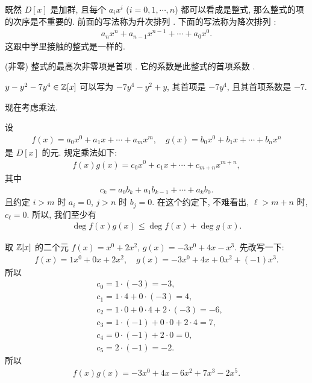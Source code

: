 \begin{remark}
    既然 $D[x]$ 是加群, 且每个 $a_i x^i$ ($i = 0,1,\cdots,n$) 都可以看成是整式, 那么整式的项的次序是不重要的. 前面的写法称为升次排列 . 下面的写法称为降次排列 :
    \begin{align*}
        a_n x^n + a_{n-1} x^{n-1} + \cdots + a_0 x^0.
    \end{align*}
    这跟中学里接触的整式是一样的.

    (非零) 整式的最高次非零项是首项 . 它的系数是此整式的首项系数 .
\end{remark}

\begin{example}
    $y - y^2 - 7y^4 \in \mathbb{Z}[x]$ 可以写为 $-7y^4 - y^2 + y$, 其首项是 $-7y^4$, 且其首项系数是 $-7$.
\end{example}

现在考虑乘法.

\begin{definition}
    设
    \begin{align*}
        f(x) = a_0 x^0 + a_1 x + \cdots + a_m x^m, \quad g(x) = b_0 x^0 + b_1 x + \cdots + b_n x^n
    \end{align*}
    是 $D[x]$ 的元. 规定乘法如下:
    \begin{align*}
        f(x) g(x) = c_0 x^0 + c_1 x + \cdots + c_{m+n} x^{m+n},
    \end{align*}
    其中
    \begin{align*}
        c_k = a_0 b_k + a_1 b_{k-1} + \cdots + a_k b_0.
    \end{align*}
    且约定 $i > m$ 时 $a_i = 0$, $j > n$ 时 $b_j = 0$. 在这个约定下, 不难看出, $\ell > m+n$ 时, $c_\ell = 0$. 所以, 我们至少有
    \begin{align*}
        \deg f(x)g(x) \leq \deg f(x) + \deg g(x).
    \end{align*}
\end{definition}

\begin{example}
    取 $\mathbb{Z}[x]$ 的二个元 $f(x)=x^0 + 2x^2$, $g(x)=-3x^0 + 4x - x^3$. 先改写一下:
    \begin{align*}
        f(x) = 1x^0 + 0x + 2x^2, \quad g(x) = -3x^0 + 4x + 0x^2 + (-1)x^3.
    \end{align*}
    所以
    \begin{align*}
         & c_0 = 1 \cdot (-3) = -3,                         \\
         & c_1 = 1 \cdot 4 + 0 \cdot (-3) = 4,              \\
         & c_2 = 1 \cdot 0 + 0 \cdot 4 + 2 \cdot (-3) = -6, \\
         & c_3 = 1 \cdot (-1) + 0 \cdot 0 + 2 \cdot 4 = 7,  \\
         & c_4 = 0 \cdot (-1) + 2 \cdot 0 = 0,              \\
         & c_5 = 2 \cdot (-1) = -2.
    \end{align*}
    所以
    \begin{align*}
        f(x) g(x) = -3x^0 + 4x - 6x^2 + 7x^3 - 2x^5.
    \end{align*}
\end{example}

